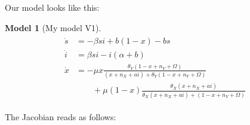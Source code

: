 \documentclass[10pt,a4paper]{article}
\newtheorem{model}{Model}[section]
\begin{document}
Our model looks like this:
	\begin{model}[My model V1]
		\begin{align}
		\begin{split}
		\dot{s} &= -\beta si + b\left(1-x\right) - bs\\
		\dot{i} &= \beta si - i\left(\alpha + b\right)\\
		\dot{x} &= -\mu x\frac{\theta_Y(1-x+n_Y+\Omega)}{(x+n_X+ai) + \theta_Y(1-x+n_Y+\Omega)}\\
		&\qquad+ \mu \left(1-x\right)\frac{\theta_X (x+ n_X+ ai)}{\theta_X (x + n_X + ai) + (1-x + n_Y + \Omega)}
		\end{split}
		\end{align}
	\end{model}
The Jacobian reads as follows:\newline\newline

\end{document}
